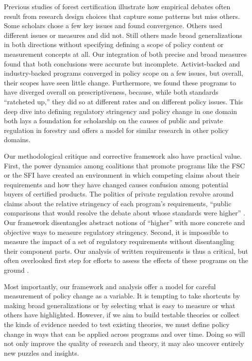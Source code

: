 \documentclass[
      12pt,
            Review ]{article}
\begin{document}
Previous studies of forest certification illustrate how empirical debates often result from research design choices that capture some patterns but miss others. Some scholars chose a few key issues and found convergence. Others used different issues or measures and did not. Still others made broad generalizations in both directions without specifying defining a scope of policy content or measurement concepts at all. Our integration of both precise and broad measures found that both conclusions were accurate but incomplete. Activist-backed and industry-backed programs converged in policy scope on a few issues, but overall, their scopes have seen little change. Furthermore, we found these programs to have diverged overall on prescriptiveness, because, while both standards ``ratcheted up,'' they did so at different rates and on different policy issues. This deep dive into defining regulatory stringency and policy change in one domain both lays a foundation for scholarship on the causes of public and private regulation in forestry and offers a model for similar research in other policy domains.

Our methodological critique and corrective framework also have practical value. First, the power dynamics among coalitions that promote programs like the FSC or the SFI have created an environment in which competing claims about their requirements and how they have changed causes confusion among potential buyers of certified products. The politics of private regulation revolve around claims about the relative stringency of each program's requirements, ``public comparisons that would resolve the debate about whose standards were higher'' \citep{Overdevest2010}. Our framework disentangles abstract notions of ``higher'' with more concrete and objective ways to measure regulatory stringency. Second, it is impossible to measure the impact of a set of regulatory requirements without disentangling their component parts. Our analysis of written requirements is thus a critical, but often overlooked first step for efforts to assess the effects of these programs on the ground \citep{Hamish2018}.

Most importantly, our framework and analysis offer a model for careful measurement of policy change as a variable. It is tempting to take shortcuts by making broad generalizations or by selecting what is easy to measure or what others have highlighted. However, if we aim to build testable theories or collect the kinds of evidence needed to test existing theories, we must define policy change in ways that can be applied across programs and over time. Doing so will not only improve the quality of research and theory, it may also uncover entirely new puzzles and insights.
  \newpage 
  \theendnotes
\newpage
\singlespacing 
           
  
\end{document}
